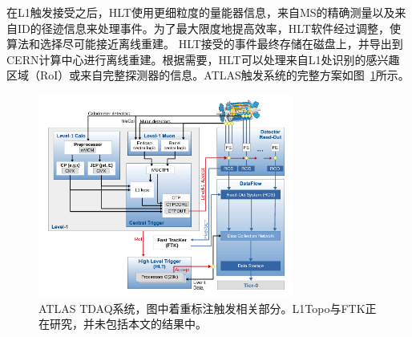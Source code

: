 在L1触发接受之后，HLT使用更细粒度的量能器信息，来自MS的精确测量以及来自ID的径迹信息来处理事件。为了最大限度地提高效率，HLT软件经过调整，使算法和选择尽可能接近离线重建。
HLT接受的事件最终存储在磁盘上，并导出到CERN计算中心进行离线重建。根据需要，HLT可以处理来自L1处识别的感兴趣区域（RoI）或来自完整探测器的信息。ATLAS触发系统的完整方案如图~\ref{fig:ATLAS_TDAQ}所示。
\begin{figure}[h]
\begin{center}
\includegraphics[width=0.75\textwidth]{fig/content_tdaq_figures_tdaq-run2-schematic.png}
\caption{ATLAS TDAQ系统\cite{Aaboud2017}，图中着重标注触发相关部分。L1Topo与FTK正在研究，并未包括本文的结果中。} \label{fig:ATLAS_TDAQ}
\end{center}
\end{figure}

